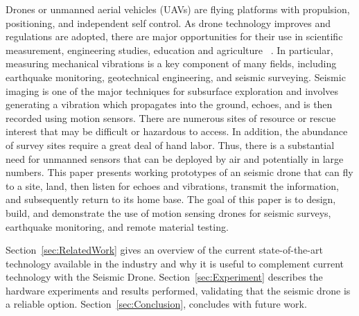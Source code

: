 Drones or unmanned aerial vehicles (UAVs) are flying
platforms with propulsion, positioning, and independent self control.
As drone technology improves and regulations are
adopted, there are major opportunities for their use in scientific measurement, engineering studies, education and agriculture ~\cite{tripicchio2015towards}. In particular,
measuring mechanical vibrations is a key component of many
fields, including earthquake monitoring, geotechnical engineering,
and seismic surveying. Seismic imaging is one of the
major techniques for subsurface exploration
and involves generating a vibration which propagates
into the ground, echoes, and is then recorded using motion
sensors. There are numerous sites of resource or rescue interest
that may be difficult or hazardous to access. In addition, the abundance of survey sites require a great deal
of hand labor. Thus, there is a substantial need for unmanned
sensors that can be deployed by air and potentially in large
numbers. This paper presents working prototypes of an seismic drone that can fly to a site, land, then
listen for echoes and vibrations, transmit the information, and
subsequently return to its home base.
The goal of this paper is to design, build, and demonstrate
the use of motion sensing drones for seismic surveys, earthquake monitoring, and remote material testing. 

Section~\ref{sec:RelatedWork}  gives an overview of  the current state-of-the-art technology available in the industry and why it is useful to complement current technology  with the Seismic Drone.
Section~\ref{sec:Experiment} describes the hardware experiments and results performed, validating that the seismic drone is a reliable option. Section~\ref{sec:Conclusion}, concludes with future work.

